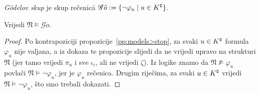 \begin{definicija}[{name=[Gödelov skup]}]
\emph{Gödelov skup} je skup rečenic\=a
    $\mathscr G\ddot o:=\{\lnot\varphi_u\mid u\in K\sp{{\scriptscriptstyle\complement}}\}$.
\end{definicija}

\begin{propozicija}[{name=[istinitost Gödelova skupa rečenica u $\mathfrak N$]}]\label{pp:NvdGo}
Vrijedi $\mathfrak N\models\mathscr G\ddot o$.
\end{propozicija}
\begin{proof}
Po kontrapoziciji propozicije~\ref{pp:models>stop}, za svaki $u\in K\sp{{\scriptscriptstyle\complement}}$ formula $\varphi_u$ nije valjana, a iz dokaza te propozicije slijedi da ne vrijedi upravo na strukturi $\mathfrak N$ (jer tamo vrijedi $\pi_u$ i sve $\iota_i$, ali ne vrijedi $\zeta$). Iz logike znamo da $\mathfrak N\nvDash\varphi_u$ povlači $\mathfrak N\models\lnot\varphi_u$, jer je $\varphi_u$ rečenica. Drugim riječima, za svaki $u\in K\sp{{\scriptscriptstyle\complement}}$ vrijedi $\mathfrak N\models\lnot\varphi_u$, što smo trebali dokazati.
\end{proof}

